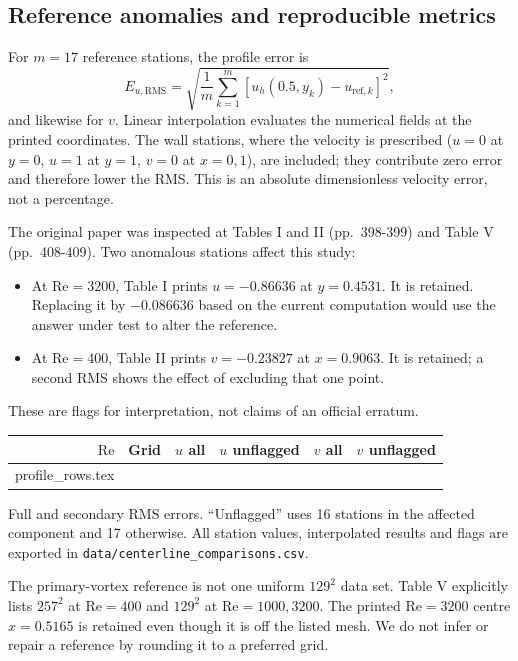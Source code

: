 \documentclass[11pt,a4paper]{article}
\makeatletter
\newcommand{\tableinput}[1]{\@@input #1 }
\newcommand{\Rey}{\mathrm{Re}}
\newcommand{\code}[1]{\texttt{#1}}
\makeatother
\begin{document}
\clearpage
\subsection{Reference anomalies and reproducible metrics}
For $m=17$ reference stations, the profile error is
\begin{equation}
E_{u,\mathrm{RMS}}=\sqrt{\frac{1}{m}\sum_{k=1}^{m}
\left[u_h(0.5,y_k)-u_{\mathrm{ref},k}\right]^2},
\end{equation}
and likewise for $v$. Linear interpolation evaluates the numerical fields
at the printed coordinates. The wall stations, where the velocity is
prescribed ($u=0$ at $y=0$, $u=1$ at $y=1$, $v=0$ at $x=0,1$), are included;
they contribute zero error and therefore lower the RMS. This is an absolute
dimensionless velocity error, not a percentage.

The original paper was inspected at Tables I and II (pp.\ 398-399) and
Table V (pp.\ 408-409). Two anomalous stations affect this study:
\begin{itemize}
\item At $\Rey=3200$, Table I prints $u=-0.86636$ at $y=0.4531$.
It is retained. Replacing it by $-0.086636$ based on the current computation
would use the answer under test to alter the reference.
\item At $\Rey=400$, Table II prints $v=-0.23827$ at $x=0.9063$.
It is retained; a second RMS shows the effect of excluding that one point.
\end{itemize}
These are flags for interpretation, not claims of an official erratum.

\begin{center}\small
\begin{tabular}{@{}rrrrrr@{}}\toprule
$\Rey$ & Grid & $u$ all & $u$ unflagged & $v$ all & $v$ unflagged\\\midrule
\tableinput{profile_rows.tex}
\bottomrule\end{tabular}
\end{center}
{\small\color{muted}Full and secondary RMS errors. ``Unflagged'' uses 16
stations in the affected component and 17 otherwise. All station values,
interpolated results and flags are exported in
\code{data/centerline\_comparisons.csv}.}

The primary-vortex reference is not one uniform $129^2$ data set. Table V
explicitly lists $257^2$ at $\Rey=400$ and $129^2$ at $\Rey=1000,3200$.
The printed $\Rey=3200$ centre $x=0.5165$ is retained even though it is off
the listed mesh. We do not infer or repair a reference by rounding it to a
preferred grid.
\end{document}
